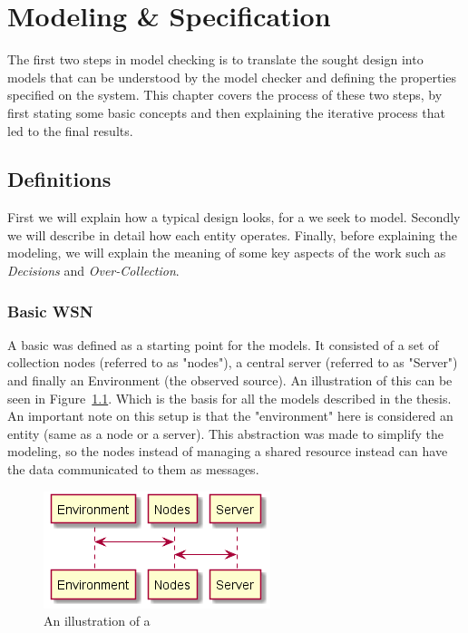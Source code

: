 \chapter{Modeling \& Specification}

The first two steps in model checking is to translate the sought design into models that can be understood by the model checker and defining the properties specified on the system. This chapter covers the process of these two steps, by first stating some basic concepts and then explaining the iterative process that led to the final results.

\section{Definitions}

First we will explain how a typical design looks, for a \wsn we seek to model. Secondly we will describe in detail how each entity operates. Finally, before explaining the modeling, we will explain the meaning of some key aspects of the work such as \textit{Decisions} and \textit{Over-Collection}.

\subsection{Basic WSN}

A basic \wsn was defined as a starting point for the models. It consisted of a set of collection nodes (referred to as "nodes"), a central server (referred to as "Server") and finally an Environment (the observed source). An illustration of this can be seen in Figure~\ref{fig:basic_wsn}. Which is the basis for all the models described in the thesis. An important note on this setup is that the "environment" here is considered an entity (same as a node or a server). This abstraction was made to simplify the modeling, so the nodes instead of managing a shared resource instead can have the data communicated to them as messages.

\begin{figure}[ht]
    \includegraphics{include/figures/basic_wsn}
    \caption{An illustration of a \wsn}
    \label{fig:basic_wsn}
\end{figure}

